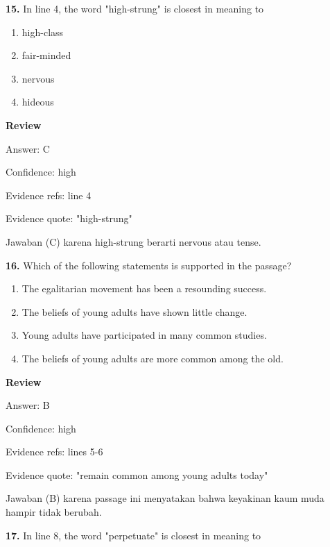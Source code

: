 \documentclass[12pt]{article}
\begin{document}
\endgroup
\par
\vspace{0.25\baselineskip}
\noindent\textbf{15.} In line 4, the word "high-strung" is closest in meaning to
\begin{enumerate}[label=(\Alph*),leftmargin=*,itemsep=0.2em]
\item high-class
\item fair-minded
\item nervous
\item hideous
\end{enumerate}
\par
\begingroup
\setlength{\parskip}{0pt}
\setlength{\parindent}{0pt}
\textbf{Review}\par
Answer: C\par
Confidence: high\par
Evidence refs: line 4\par
Evidence quote: "high-strung"\par
Jawaban (C) karena high-strung berarti nervous atau tense.\par
\endgroup
\par
\vspace{0.25\baselineskip}
\noindent\textbf{16.} Which of the following statements is supported in the passage?
\begin{enumerate}[label=(\Alph*),leftmargin=*,itemsep=0.2em]
\item The egalitarian movement has been a resounding success.
\item The beliefs of young adults have shown little change.
\item Young adults have participated in many common studies.
\item The beliefs of young adults are more common among the old.
\end{enumerate}
\par
\begingroup
\setlength{\parskip}{0pt}
\setlength{\parindent}{0pt}
\textbf{Review}\par
Answer: B\par
Confidence: high\par
Evidence refs: lines 5-6\par
Evidence quote: "remain common among young adults today"\par
Jawaban (B) karena passage ini menyatakan bahwa keyakinan kaum muda hampir tidak berubah.\par
\endgroup
\par
\vspace{0.25\baselineskip}
\noindent\textbf{17.} In line 8, the word "perpetuate" is closest in meaning to
\end{document}
